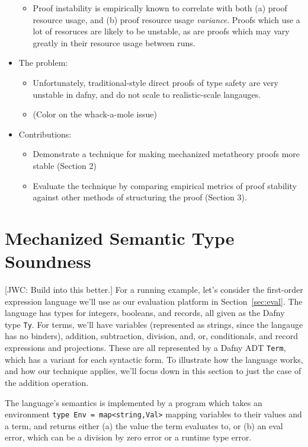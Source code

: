 \documentclass[sigplan,review,screen,anonymous]{acmart}
\newcommand{\comm}[3]{\textcolor{#1}{[#2: #3]}}
\newcommand{\jwc}[1]{\comm{dkgreen}{JWC}{#1}}
\begin{document}
\begin{itemize}
\begin{itemize}
      \item Proof instability is empirically known to correlate with both (a) proof resource usage, and (b) proof resource usage \emph{variance}.
      Proofs which use a lot of resoruces are likely to be unstable, as are proofs which may vary greatly in their resource usage between runs.
    \end{itemize}

    \item The problem:
    \begin{itemize}
      \item Unfortunately, traditional-style direct proofs of type safety are very unstable in dafny, and do not scale to realistic-scale langauges.
      \item (Color on the whack-a-mole issue) 
    \end{itemize}

    \item Contributions: 
    \begin{itemize}
      \item Demonstrate a technique for making mechanized metatheory proofs more stable (Section 2)
      \item Evaluate the technique by comparing empirical metrics of proof stability against other methods of structuring the proof (Section 3).
    \end{itemize}
    
\end{itemize}

\section{Mechanized Semantic Type Soundness}
\label{sec:sts}

\jwc{Build into this better.}
For a running example, let's consider the first-order expression language we'll
use as our evaluation platform in Section~\ref{sec:eval}.  The language has
types for integers, booleans, and records, all given as the Dafny type
\texttt{Ty}.  For terms, we'll have variables (represented as strings, since the
langauge has no binders), addition, subtraction, division, and, or,
conditionals, and record expressions and projections. These are all represented
by a Dafny ADT \texttt{Term}, which has a variant for each syntactic form.
To illustrate how the language works, and how our technique applies, we'll focus
down in this section to just the case of the addition operation.

The language's semantics is implemented by a program which takes an environment \texttt{type
Env = map<string,Val>} mapping variables to their values and a term, and returns
either (a) the value the term evaluates to, or (b) an eval error, which can be a
division by zero error or a runtime type error.
\end{document}
